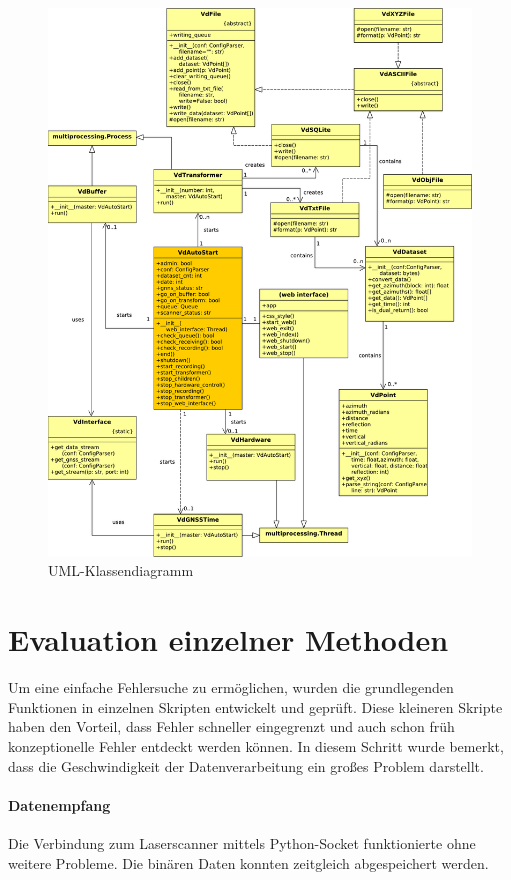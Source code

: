 \documentclass[a4paper,12pt,bibliography=totoc, listof=totoc,titlepage,pointlessnumbers]{scrreprt}
\begin{document}
\begin{figure}
 \centering
 \includegraphics[width=1\textwidth]{./img/UML.pdf}
 \caption{UML-Klassendiagramm}
 \label{img:uml}
\end{figure}

\section{Evaluation einzelner Methoden}
Um eine einfache Fehlersuche zu ermöglichen, wurden die grundlegenden Funktionen in einzelnen Skripten entwickelt und geprüft. Diese kleineren Skripte haben den Vorteil, dass Fehler schneller eingegrenzt und auch schon früh konzeptionelle Fehler entdeckt werden können. In diesem Schritt wurde bemerkt, dass die Geschwindigkeit der Datenverarbeitung ein großes Problem darstellt. 

\paragraph{Datenempfang}
Die Verbindung zum Laser\-scan\-ner mittels Python-Socket funktionierte ohne weitere Probleme. Die binären Daten konnten zeitgleich abgespeichert werden.
\end{document}
